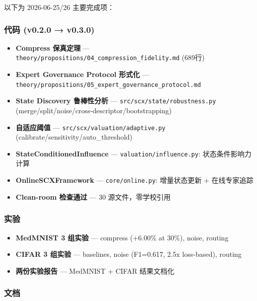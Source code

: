 \documentclass[
  12pt,
]{ctexart}
\providecommand{\tightlist}{%
  \setlength{\itemsep}{0pt}\setlength{\parskip}{0pt}}
\begin{document}
以下为 2026-06-25/26 主要完成项：

\subsubsection{代码 (v0.2.0 → v0.3.0)}\label{ux4ee3ux7801-v0.2.0-v0.3.0}

\begin{itemize}
\tightlist
\item[$\boxtimes$]
  \textbf{Compress 保真定理} ---
  \texttt{theory/propositions/04\_compression\_fidelity.md} (689行)
\item[$\boxtimes$]
  \textbf{Expert Governance Protocol 形式化} ---
  \texttt{theory/propositions/05\_expert\_governance\_protocol.md}
\item[$\boxtimes$]
  \textbf{State Discovery 鲁棒性分析} ---
  \texttt{src/scx/state/robustness.py}
  (merge/split/noise/cross-descriptor/bootstrapping)
\item[$\boxtimes$]
  \textbf{自适应阈值} --- \texttt{src/scx/valuation/adaptive.py}
  (calibrate/sensitivity/auto\_threshold)
\item[$\boxtimes$]
  \textbf{StateConditionedInfluence} ---
  \texttt{valuation/influence.py}: 状态条件影响力计算
\item[$\boxtimes$]
  \textbf{OnlineSCXFramework} --- \texttt{core/online.py}: 增量状态更新
  + 在线专家追踪
\item[$\boxtimes$]
  \textbf{Clean-room 检查通过} --- 30 源文件，零学校引用
\end{itemize}

\subsubsection{实验}\label{ux5b9eux9a8c}

\begin{itemize}
\tightlist
\item[$\boxtimes$]
  \textbf{MedMNIST 3 组实验} --- compress (+6.00\% at 30\%), noise,
  routing
\item[$\boxtimes$]
  \textbf{CIFAR 3 组实验} --- baselines, noise (F1=0.617, 2.5x
  loss-based), routing
\item[$\boxtimes$]
  \textbf{两份实验报告} --- MedMNIST + CIFAR 结果文档化
\end{itemize}

\subsubsection{文档}\label{ux6587ux6863}
\end{document}

